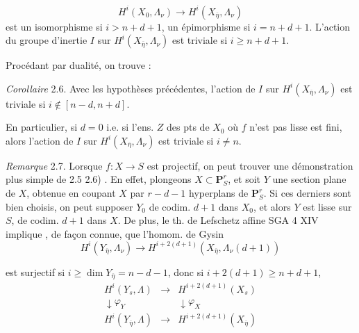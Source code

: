 \documentclass[11pt,a4paper]{article}
\begin{document}

\[
H^i(X_0, \Lambda_\nu) \longrightarrow H^i(X_{\overline{\eta}}, \Lambda_\nu)
\]
est un isomorphisme si $i > n + d + 1$, un épimorphisme si $i = n + d + 1$. L'action du groupe d'inertie \struck{\ill{}} $I$ sur $H^i(X_{\overline{\eta}}, \Lambda_\nu)$ est triviale si $i \geqslant n + d + 1$.

Procédant par dualité, on trouve :

\emph{Corollaire} 2.6. Avec les hypothèses précédentes, l'action de $I$ sur $H^i(X_{\overline{\eta}}, \Lambda_\nu)$ est triviale si $i \notin [n - d, n + d]$.

En particulier, si $d = 0$ i.e. si l'ens. $Z$ des pts de $X_0$ où $f$ n'est pas lisse est fini, alors l'action de $I$ sur $H^i(X_{\overline{\eta}}, \Lambda_\nu)$ est triviale si $i \neq n$.

\emph{Remarque} 2.7. Lorsque $f : X \to S$ est projectif, on peut trouver une démonstration plus simple de \struck{\ill{}}  2.5   2.6)  \struck{\ill{} \ill{} \ill{} \ill{}}. En effet, plongeons $X \subset \mathbf{P}^r_S$, et soit $Y$ une section plane  de $X$, obtenue en coupant $X$ par $r - d - 1$ \struck{\ill{}} hyperplans de $\mathbf{P}^r_S$. Si ces derniers sont bien choisis, on peut supposer $Y_0$  de codim. $d + 1$ dans $X_0$, et alors $Y$ est lisse sur $S$, de codim. $d + 1$ dans $X$. De plus, le th. de Lefschetz affine SGA 4 XIV implique , \struck{\ill{}} de façon connue, que l'homom. de Gysin
\[
H^i(Y_{\overline{\eta}}, \Lambda_\nu) \longrightarrow H^{i + 2(d+1)}(X_{\overline{\eta}}, \Lambda_\nu(d + 1))
\]


est surjectif si $i \geqslant \dim Y_{\overline{\eta}} = n - d - 1$,  donc si $i + 2(d + 1) \geqslant n + d + 1$, 
\[
\begin{array}{ccc}
H^i(Y_s, \Lambda) & \longrightarrow & H^{i + 2(d+1)}(X_s) \\
\downarrow{\scriptstyle \varphi_Y} & & \downarrow{\scriptstyle \varphi_X} \\
H^i(Y_{\overline{\eta}}, \Lambda) & \longrightarrow & H^{i + 2(d+1)}(X_{\overline{\eta}})
\end{array}
\]
\end{document}
